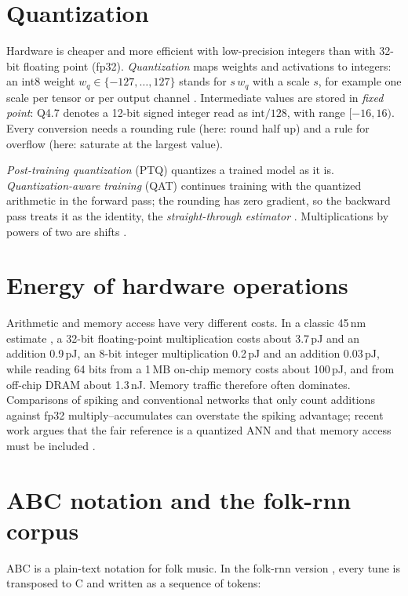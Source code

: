 \section{Quantization}

Hardware is cheaper and more efficient with low-precision integers than with 32-bit floating point (fp32).
\emph{Quantization} maps weights and activations to integers: an int8 weight $w_q \in \{-127, \dots, 127\}$ stands
for $s\, w_q$ with a scale $s$, for example one scale per tensor or per output channel \citep{jacob2018quantization}.
Intermediate values are stored in \emph{fixed point}: Q4.7 denotes a 12-bit signed integer read as
$\mathrm{int}/128$, with range $[-16, 16)$. Every conversion needs a rounding rule (here: round half up) and a rule
for overflow (here: saturate at the largest value).

\emph{Post-training quantization} (PTQ) quantizes a trained model as it is. \emph{Quantization-aware training} (QAT)
continues training with the quantized arithmetic in the forward pass; the rounding has zero gradient, so the
backward pass treats it as the identity, the \emph{straight-through estimator} \citep{bengio2013estimating}.
Multiplications by powers of two are shifts \citep{elhoushi2021deepshift}.

\section{Energy of hardware operations}

Arithmetic and memory access have very different costs. In a classic 45\,nm estimate \citep{horowitz2014energy}, a
32-bit floating-point multiplication costs about 3.7\,pJ and an addition 0.9\,pJ, an 8-bit integer multiplication
0.2\,pJ and an addition 0.03\,pJ, while reading 64 bits from a 1\,MB on-chip memory costs about 100\,pJ, and from
off-chip DRAM about 1.3\,nJ. Memory traffic therefore often dominates. Comparisons of spiking and conventional
networks that only count additions against fp32 multiply--accumulates can overstate the spiking advantage; recent
work argues that the fair reference is a quantized ANN and that memory access must be included
\citep{yan2024reconsidering, shen2024efficient}.

\section{ABC notation and the folk-rnn corpus}

ABC is a plain-text notation for folk music. In the folk-rnn version \citep{sturm2016folkrnn}, every tune is
transposed to C and written as a sequence of tokens:

